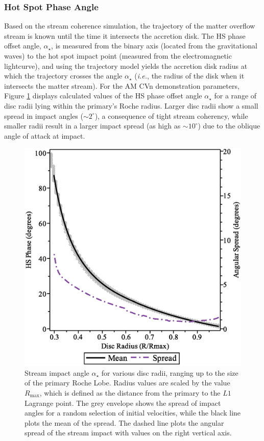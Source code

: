 \documentclass[preprint2]{aastex}
\begin{document}
\subsubsection{Hot Spot Phase Angle}
Based on the stream coherence simulation, the trajectory of the matter
overflow stream is known until the time it intersects the accretion
disk.  The HS phase offset angle, $\alpha_\star$, is measured from the binary
axis (located from the gravitational waves) to the hot spot impact
point (measured from the electromagnetic lightcurve), and using the
trajectory model yields the accretion disk radius at which the
trajectory crosses the angle $\alpha_\star$ ({\it i.e.}, the radius of the
disk when it intersects the matter stream).  For the AM CVn
demonstration parameters, Figure \ref{fig.impact_angle} displays
calculated values of the HS phase offset angle $\alpha_\star$ for a range of
disc radii lying within the primary's Roche radius.  Larger disc radii
show a small spread in impact angles ($\sim 2^{\circ}$), a consequence
of tight stream coherency, while smaller radii result in a larger
impact spread (as high as $\sim 10^{\circ}$) due to the oblique angle
of attack at impact.

\begin{figure}[h]
  \includegraphics[width=\columnwidth]{./figs/impact_angle_0.06.eps}
  \caption{Stream impact angle $\alpha_\star$ for various disc radii,
  ranging up to the size of the primary Roche Lobe.  Radius values are
  scaled by the value $R_\text{max}$, which is defined as the distance
  from the primary to the $L1$ Lagrange point.  The grey envelope
  shows the spread of impact angles for a random selection of initial
  velocities, while the black line plots the mean of the spread.  The
  dashed line plots the angular spread of the stream impact with
  values on the right vertical axis.}
  \label{fig.impact_angle}
\end{figure}
\end{document}
